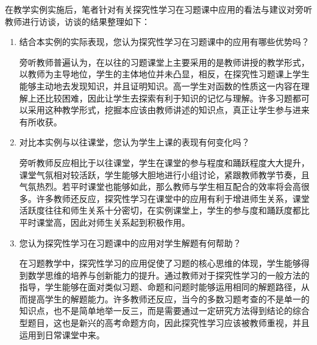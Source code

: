 在教学实例实施后，笔者针对有关探究性学习在习题课中应用的看法与建议对旁听教师进行访谈，访谈的结果整理如下：

\begin{enumerate}[1.]
  \item 结合本实例的实际表现，您认为探究性学习在习题课中的应用有哪些优势吗？

  旁听教师普遍认为，在以往的习题课堂上主要采用的是教师讲授的教学形式，以教师为主导地位，学生的主体地位并未凸显，相反，在探究性习题课上学生能够主动地去发现知识，并且证明知识。高一学生对函数的性质这一内容在理解上还比较困难，因此让学生去探索有利于知识的记忆与理解。许多习题都可以采用这种教学形式，挖掘本应该由教师讲述的知识点，真正让学生参与进来有所收获。
  
  \item 对比本实例与以往课堂，您认为学生上课的表现有何变化吗？
  
  旁听教师反应相比于以往课堂，学生在课堂的参与程度和踊跃程度大大提升，课堂气氛相对较活跃，学生能够大胆地进行小组讨论，紧跟教师教学节奏，且气氛热烈。若平时课堂也能够如此，那么教师与学生相互配合的效率将会高很多。许多教师还反应，探究性学习在课堂中的应用有利于增进师生关系，课堂活跃度往往和师生关系十分密切，在实例课堂上，学生的参与度和踊跃度都比平时课堂高，因此对师生关系起到积极作用。
  
  \item 您认为探究性学习在习题课中的应用对学生解题有何帮助？
  
  在习题教学中，探究性学习的应用促使了习题的核心思维的体现，学生能够得到数学思维的培养与创新能力的提升。通过教师对于探究性学习的一般方法的指导，学生能够在面对类似习题、命题和问题时能够运用相同的解题路径，从而提高学生的解题能力。许多教师还反应，当今的多数习题考查的不是单一的知识点，也不是简单地举一反三，而是需要通过一定研究方法得到结论的综合型题目，这也是新兴的高考命题方向，因此探究性学习应该被教师重视，并且运用到日常课堂中来。
\end{enumerate}
